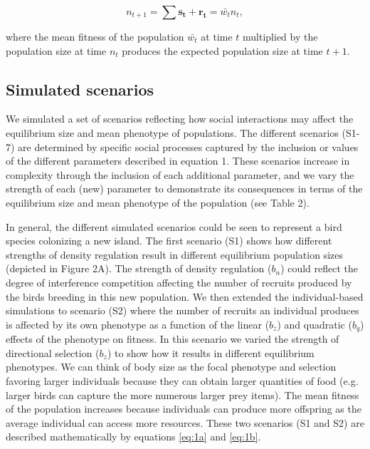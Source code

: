 \documentclass{article}
\begin{document}
\begin{equation} \label{eq:fitness measure}
n_{t+1}=\sum \mathbf{s_{t}} + \mathbf{r_{t}}=\bar{w_{t}}n_{t}, 
\end{equation}

\noindent where the mean fitness of the population $\bar{w_{t}}$ at time $t$ multiplied by the population size at time $n_{t}$ produces the expected population size at time $t + 1$. 

 
\subsection{Simulated scenarios}
We simulated a set of scenarios reflecting how social interactions may affect the equilibrium size and mean phenotype of populations. The different scenarios (S1-7) are determined by specific social processes captured by the inclusion or values of the different parameters described in equation 1. These scenarios increase in complexity through the inclusion of each additional parameter, and we vary the strength of each (new) parameter to demonstrate its consequences in terms of the equilibrium size and mean phenotype of the population (see Table 2). 

In general, the different simulated scenarios could be seen to represent a bird species colonizing a new island. The first scenario (S1) shows how different strengths of density regulation result in different equilibrium population sizes (depicted in Figure 2A). The strength of density regulation ($b_n$) could reflect the degree of interference competition affecting the number of recruits produced by the birds breeding in this new population. We then extended the individual-based simulations to scenario (S2) where the number of recruits an individual produces is affected by its own phenotype as a function of the linear ($b_z$) and quadratic ($b_q$) effects of the phenotype on fitness. In this scenario we varied the strength of directional selection ($b_z$) to show how it results in different equilibrium phenotypes. We can think of body size as the focal phenotype and selection favoring larger individuals because they can obtain larger quantities of food (e.g. larger birds can capture the more numerous larger prey items). The mean fitness of the population increases because individuals can produce more offspring as the average individual can access more resources. These two scenarios (S1 and S2) are described mathematically by equations \ref{eq:1a} and \ref{eq:1b}. 
\end{document}
